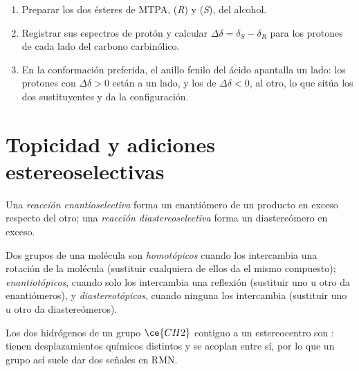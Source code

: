 \begin{method}\label{met:b3:asymmetric-synthesis:mosher}
\begin{enumerate}
  \item Preparar los dos ésteres de MTPA, (\textit{R}) y (\textit{S}), del alcohol.
  \item Registrar sus espectros de protón y calcular $\Delta\delta = \delta_S - \delta_R$ para los protones de cada
        lado del carbono carbinólico.
  \item En la conformación preferida, el anillo fenilo del ácido apantalla un lado:
        los protones con $\Delta\delta > 0$ están a un lado, y los de $\Delta\delta < 0$, al otro, lo que
        sitúa los dos sustituyentes y da la configuración.
\end{enumerate}
\end{method}

\section{Topicidad y adiciones estereoselectivas}

\begin{definition}\label{def:b3:asymmetric-synthesis:selective}
Una \emph{reacción enantioselectiva} forma un
enantiómero de un producto en exceso respecto del otro; una \emph{reacción
diastereoselectiva} forma un diastereómero en exceso.
\end{definition}

\begin{definition}[Topicidad]\label{def:b3:asymmetric-synthesis:topicity}
Dos grupos de una molécula son \emph{homotópicos} cuando los intercambia
una rotación de la molécula (sustituir cualquiera de ellos da el mismo compuesto);
\emph{enantiotópicos}, cuando solo los intercambia una reflexión
(sustituir uno u otro da enantiómeros), y
\emph{diastereotópicos}, cuando ninguna  los
intercambia (sustituir uno u otro da diastereómeros).
\end{definition}

Los dos hidrógenos de un grupo $\ce{CH2}$ contiguo a un estereocentro son :
tienen desplazamientos químicos distintos y se acoplan entre sí, por lo que un grupo así
suele dar dos señales en RMN.

